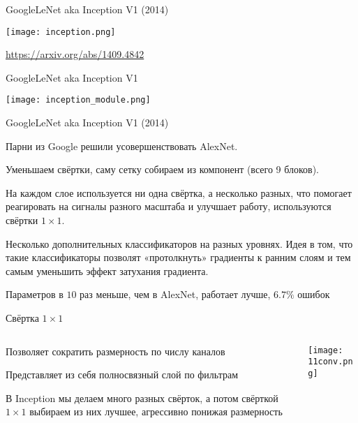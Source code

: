 \documentclass[notes,12pt, aspectratio=169]{beamer}
\newenvironment{wideitemize}{\itemize\addtolength{\itemsep}{10pt}}{\enditemize}
\begin{document}
\begin{frame}{GoogleLeNet aka Inception V1  (2014)}
	\begin{center}
		\texttt{[image: inception.png]}
	\end{center}
\vfill %
\footnotesize
\color{blue} \url{https://arxiv.org/abs/1409.4842}
\end{frame}


\begin{frame}{GoogleLeNet aka Inception V1}
\begin{center}
	\texttt{[image: inception\_module.png]}
\end{center}
\end{frame}


\begin{frame}{GoogleLeNet aka Inception V1  (2014)}
\begin{wideitemize}
	\item  Парни из Google решили усовершенствовать AlexNet.
	
	\item  Уменьшаем свёртки, саму \alert{сетку собираем из компонент}  (всего 9 блоков).
	
	\item  На каждом слое используется ни одна свёртка, а несколько разных, что помогает реагировать на сигналы разного масштаба и улучшает работу, используются  \alert{свёртки $1 \times 1$.}
	
	\item \alert{Несколько дополнительных классификаторов на разных уровнях.} Идея в том, что такие классификаторы позволят «протолкнуть» градиенты к ранним слоям и тем самым уменьшить эффект затухания градиента.
	
	\item  Параметров  в $10$ раз меньше, чем в AlexNet, работает лучше, $6.7\%$ ошибок 
\end{wideitemize}
\end{frame}


\begin{frame}{Свёртка $1 \times 1$}
\begin{columns}[T] %
	\begin{column}{.4\textwidth}
			\begin{wideitemize}
				\item  Позволяет сократить размерность по числу каналов
				\item  Представляет из себя полносвязный слой по фильтрам 
				\item  В Inception мы делаем много разных свёрток, а потом свёрткой $1 \times 1$ выбираем из них лучшее, агрессивно понижая размерность
			\end{wideitemize}
	\end{column}%
	\hfill%
	\begin{column}{.6\textwidth}
		 \texttt{[image: 11conv.png]}
	\end{column}%
\end{columns}
\end{frame}
\end{document}

